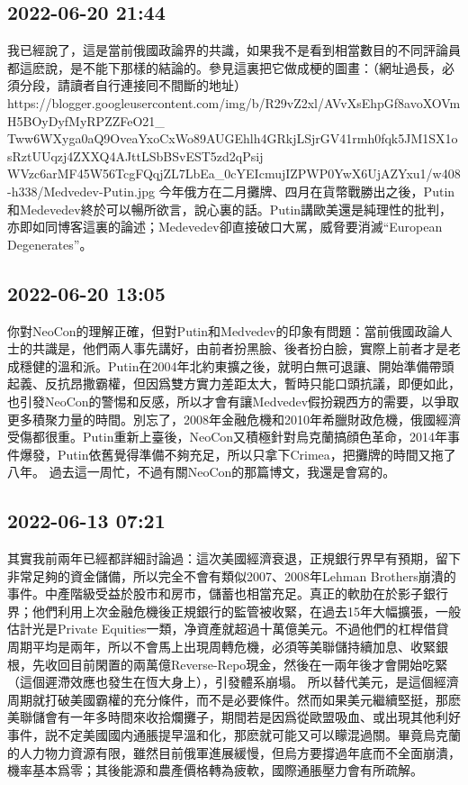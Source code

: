 \documentclass[twocolumn]{ctexart}
\begin{document}
\subsection*{2022-06-20 21:44}

我已經說了，這是當前俄國政論界的共識，如果我不是看到相當數目的不同評論員都這麽說，是不能下那樣的結論的。參見這裏把它做成梗的圖畫：（網址過長，必須分段，請讀者自行連接囘不間斷的地址）
https://blogger.googleusercontent.com/img/b/R29vZ2xl/AVvXsEhpGf8avoXOVmH5BOyDyfMyRPZZFeO21\_
Tww6WXyga0aQ9OveaYxoCxWo89AUGEhlh4GRkjLSjrGV41rmh0fqk5JM1SX1osRztUUqzj4ZXXQ4AJttLSbBSvEST5zd2qPsij
WVzc6arMF45W56TcgFQqjZL7LbEa\_0cYEIcmujIZPWP0YwX6UjAZYxu1/w408-h338/Medvedev-Putin.jpg
今年俄方在二月攤牌、四月在貨幣戰勝出之後，Putin和Medevedev終於可以暢所欲言，說心裏的話。Putin講歐美還是純理性的批判，亦即如同博客這裏的論述；Medevedev卻直接破口大駡，威脅要消滅“European Degenerates”。
\subsection*{2022-06-20 13:05}

你對NeoCon的理解正確，但對Putin和Medvedev的印象有問題：當前俄國政論人士的共識是，他們兩人事先講好，由前者扮黑臉、後者扮白臉，實際上前者才是老成穩健的溫和派。Putin在2004年北約東擴之後，就明白無可退讓、開始準備帶頭起義、反抗昂撒霸權，但因爲雙方實力差距太大，暫時只能口頭抗議，即便如此，也引發NeoCon的警惕和反感，所以才會有讓Medvedev假扮親西方的需要，以爭取更多積聚力量的時間。別忘了，2008年金融危機和2010年希臘財政危機，俄國經濟受傷都很重。Putin重新上臺後，NeoCon又積極針對烏克蘭搞顔色革命，2014年事件爆發，Putin依舊覺得準備不夠充足，所以只拿下Crimea，把攤牌的時間又拖了八年。
過去這一周忙，不過有關NeoCon的那篇博文，我還是會寫的。
\subsection*{2022-06-13 07:21}

其實我前兩年已經都詳細討論過：這次美國經濟衰退，正規銀行界早有預期，留下非常足夠的資金儲備，所以完全不會有類似2007、2008年Lehman Brothers崩潰的事件。中產階級受益於股市和房市，儲蓄也相當充足。真正的軟肋在於影子銀行界；他們利用上次金融危機後正規銀行的監管被收緊，在過去15年大幅擴張，一般估計光是Private Equities一類，净資產就超過十萬億美元。不過他們的杠桿借貸周期平均是兩年，所以不會馬上出現周轉危機，必須等美聯儲持續加息、收緊銀根，先收回目前閑置的兩萬億Reverse-Repo現金，然後在一兩年後才會開始吃緊（這個遲滯效應也發生在恆大身上），引發體系崩塌。
所以替代美元，是這個經濟周期就打破美國霸權的充分條件，而不是必要條件。然而如果美元繼續堅挺，那麽美聯儲會有一年多時間來收拾爛攤子，期間若是因爲從歐盟吸血、或出現其他利好事件，説不定美國國内通脹提早溫和化，那麽就可能又可以矇混過關。畢竟烏克蘭的人力物力資源有限，雖然目前俄軍進展緩慢，但烏方要撐過年底而不全面崩潰，機率基本爲零；其後能源和農產價格轉為疲軟，國際通脹壓力會有所疏解。
\end{document}
